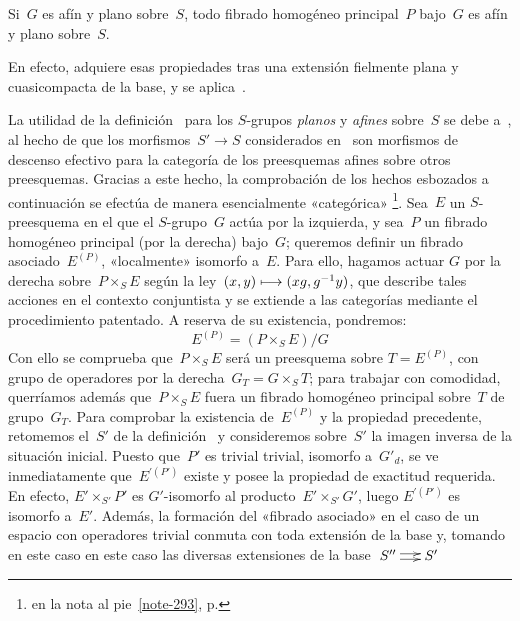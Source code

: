 \begin{corollaire}
\label{XI.4.3}
Si~$G$ es afín y plano sobre~$S$, todo fibrado homogéneo principal~$P$
bajo~$G$ es afín y plano sobre~$S$.
\end{corollaire}

En efecto, adquiere esas propiedades tras una extensión fielmente plana y
cuasicompacta de la base, y se aplica~.

La utilidad de la definición~ para los $S$-grupos \emph{planos}
y \emph{afines} sobre~$S$ se debe a~, \ie al hecho de que los
morfismos~$S'\to S$ considerados en~ son morfismos de descenso
efectivo para la categoría de los preesquemas afines sobre otros
preesquemas. Gracias a este hecho, la comprobación de los hechos esbozados a
continuación se efectúa de manera esencialmente «categórica»%
\footnote{\Cf \loccit en la nota al pie~\eqref{note-293},
p\ptbl\pageref{note-293}.}. Sea~$E$ un $S$-preesquema en el que el
$S$-grupo~$G$ actúa por la izquierda, y sea~$P$ un fibrado homogéneo principal
(por la derecha) bajo~$G$; queremos definir un fibrado asociado~$E^{(P)}$,
«localmente» isomorfo a~$E$. Para ello, hagamos actuar
$G$ por la derecha sobre~$P\times_S E$ según la ley~$(x,y)\longmapsto
(xg,g^{-1}y)$, que describe tales acciones en el contexto conjuntista y se
extiende a las categorías mediante el procedimiento patentado. A reserva de
su existencia, pondremos:
$$
E^{(P)}=(P\times_S E)/G
$$
Con ello se comprueba que~$P\times_S E$ será un preesquema sobre
$T=E^{(P)}$, con grupo de operadores por la derecha~$G_T=G\times_S T$; para
trabajar con comodidad, querríamos además que~$P\times_S E$ fuera un fibrado
homogéneo principal sobre~$T$ de grupo~$G_T$. Para comprobar la existencia
de~$E^{(P)}$ y la propiedad precedente, retomemos el~$S'$ de la
definición~ y consideremos sobre~$S'$ la imagen inversa de la
situación inicial. Puesto que~$P'$ es
{trivial}
{trivial,}
\ie isomorfo a~$G'_d$, se ve inmediatamente que~$E^{\prime(P')}$ existe y
posee la propiedad de exactitud requerida. En efecto,
$E'\times_{S'} P'$ es $G'$-isomorfo al producto~$E'\times_{S'} G'$, luego
$E^{\prime(P')}$ es isomorfo a~$E'$. Además, la formación del «fibrado
asociado» en el caso de un espacio con operadores trivial conmuta con toda
extensión de la base y, tomando
{en este caso}
{en este caso}
las diversas extensiones de la base
\begingroup
\shorthandoff{<>}%
$\xymatrix@C=.5cm{S''\ar@<2pt>[r]\ar@<-2pt>[r]&S'}$
